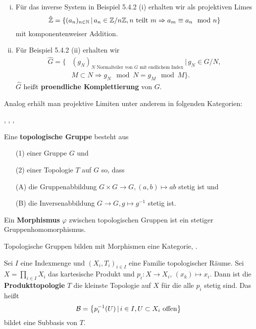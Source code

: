 

\begin{Bsp}
\begin{enumerate}[(i)]
\item Für das inverse System in Beispiel 5.4.2 (i) erhalten wir als projektiven Limes
\[ \hat{\mathbb{Z}} = \left\{ (a_n)_{n\in\mathbb{N}} \, | \, a_n \in \mathbb{Z}/n\mathbb{Z}, n \text{ teilt } m \Rightarrow a_m \equiv a_n \mod n  \right\}
\]
mit komponentenweiser Addition.
\item Für Beispiel 5.4.2 (ii) erhalten wir
\begin{align*}
\hat{G} = \{ &(g_N)_{\text{$N$ Normalteiler von $G$ mit endlichem Index}} \, | \, g_N \in G/N, \\
&M \subset N \Rightarrow g_N \mod N = g_M \mod M  \}.
\end{align*}
$\hat{G}$ heißt \textbf{proendliche Komplettierung} von $G$.
\end{enumerate}
\end{Bsp}

\begin{Bem}
Analog erhält man projektive Limiten unter anderem in folgenden Kategorien:
\begin{center}
\Mengen, \Ringe, \Rmod, \kalg
\end{center}
\end{Bem}

\begin{defi}
Eine \textbf{topologische Gruppe} besteht aus
\begin{itemize}
\item[(1)] einer Gruppe $G$ und
\item[(2)] einer Topologie $T$ auf $G$ so, dass
\item[(A)] die Gruppenabbildung $G\times G \to G, (a,b) \mapsto ab$ stetig ist und
\item[(B)] die Inversenabbildung $G\to G, g \mapsto g^{-1}$  stetig ist.
\end{itemize}
Ein  \textbf{Morphismus} $\varphi$ zwischen topologischen Gruppen ist ein stetiger Gruppenhomomorphismus.
\end{defi}

\begin{Bem}
Topologische Gruppen bilden mit Morphismen eine Kategorie, \TopGroups.
\end{Bem}

\begin{defi}
Sei $I$ eine Indexmenge und $(X_i,T_i)_{i\in I}$ eine Familie topologischer Räume. Sei $X=\prod_{i\in I}X_i$ das kartesische Produkt und $p_i \colon X \to X_i, \, (x_k) \mapsto x_i$.
Dann ist die \textbf{Produkttopologie} $T$ die kleinste Topologie auf $X$ für die alle $p_i$ stetig sind. Das heißt
\[ \mathcal{B} = \left\{ p_i^{-1}(U) \,|\, i \in I, U \subset X_i \text{ offen}   \right\}
\]
bildet eine Subbasis von $T$.
\end{defi}

